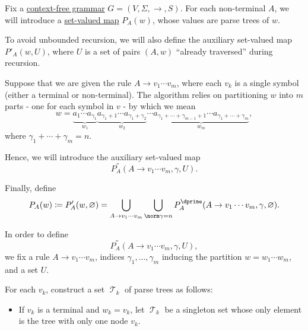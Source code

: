 \begin{algorithm}\label{alg:brute_force_parsing}
  Fix a \hyperref[def:chomsky_hierarchy/context_free]{context-free grammar} \( G = (V, \Sigma, \to, S) \). For each non-terminal \( A \), we will introduce a \hyperref[def:function]{set-valued map} \( P_A(w) \), whose values are parse trees of \( w \).

  To avoid unbounded recursion, we will also define the auxiliary set-valued map \( P'_A(w, U) \), where \( U \) is a set of pairs \( (A, w) \) \enquote{already traversed} during recursion.

  Suppose that we are given the rule \( A \to v_1 \cdots v_m \), where each \( v_k \) is a single symbol (either a terminal or non-terminal). The algorithm relies on partitioning \( w \) into \( m \) parts - one for each symbol in \( v \) - by which we mean
  \begin{equation*}
    w = \underbrace{ a_1 \cdots a_{\gamma_1} }_{w_1} \underbrace{ a_{\gamma_1 + 1} \cdots a_{\gamma_1 + \gamma_2} }_{w_2} \cdots \underbrace{ a_{\gamma_1 + \cdots + \gamma_{m-1} + 1} \cdots a_{\gamma_1 + \cdots + \gamma_m} }_{w_m},
  \end{equation*}
  where \( \gamma_1 + \cdots + \gamma_m = n \).

  Hence, we will introduce the auxiliary set-valued map
  \begin{equation*}
    P^\dprime_A(A \to v_1 \cdots v_m, \gamma, U).
  \end{equation*}

  Finally, define
  \begin{equation*}
    P_A(w)
    \coloneqq
    P'_A(w, \varnothing)
    =
    \bigcup_{A \to v_1 \cdots v_m} \bigcup_{\norm \gamma = n} P^\dprime_A(A \to v_1 \cdots v_m, \gamma, \varnothing).
  \end{equation*}

  \begin{thmenum}
     In order to define
    \begin{equation*}
      P^\dprime_A(A \to v_1 \cdots v_m, \gamma, U),
    \end{equation*}
    we fix a rule \( A \to v_1 \cdots v_m \), indices \( \gamma_1, \ldots, \gamma_m \) inducing the partition \( w = w_1 \cdots w_m \), and a set \( U \).

     For each \( v_k \), construct a set \( \mscrT_k \) of parse trees as follows:
    \begin{itemize}
      \item If \( v_k \) is a terminal and \( w_k = v_k \), let \( \mscrT_k \) be a singleton set whose only element is the tree with only one node \( v_k \).


\end{itemize}
\end{thmenum}
\end{algorithm}

